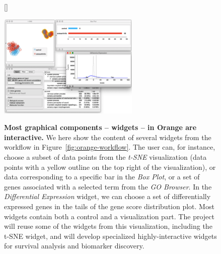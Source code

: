 \documentclass[11pt,a4paper]{article}
\renewcommand{\bold}{\textbf}
\begin{document}
\begin{figure}[htbp]
[\FBwidth]
{\caption{\small\bold{Most graphical components -- widgets -- in Orange are interactive.} We here show the content of several widgets from the workflow in Figure~\ref{fig:orange-workflow}. The user can, for instance, choose a subset of data points from the {\em t-SNE} visualization (data points with a yellow outline on the top right of the visualization), or data corresponding to a specific bar in the {\em Box Plot}, or a set of genes associated with a selected term from the {\em GO Browser}. In the {\em Differential Expression} widget, we can choose a set of differentially expressed genes in the tails of the gene score distribution plot. Most widgets contain both a control and a visualization part. The project will reuse some of the widgets from this visualization, including the t-SNE widget, and will develop specialized highly-interactive widgets for survival analysis and biomarker discovery.}
\label{fig:orange-interactivity}}
{\includegraphics[width=0.6\textwidth]{orange-interactivity}}
\end{figure}
\end{document}

